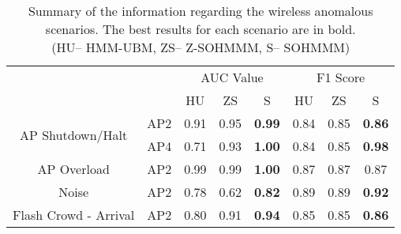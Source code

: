 \begin{table*}[h]
\centering
\caption{Summary of the information regarding the wireless anomalous scenarios. The best results for each scenario are in bold. \\(HU-- HMM-UBM, ZS-- Z-SOHMMM, S-- SOHMMM)}
\label{tbl:sohmmm_results}
\small
\begin{tabular}{cc|ccc|ccc|}
	\cline{3-8}
	& &\multicolumn{3}{c|}{AUC Value} & \multicolumn{3}{c|}{F1 Score} \\ 
	\cline{3-8}
	& & HU & ZS & S & HU & ZS & S \\
		
	\hline
		
	\multicolumn{1}{|c|}{\multirow{2}{*}{AP Shutdown/Halt}} &
	\multicolumn{1}{c|}{AP2} & 0.91 & 0.95 & \textbf{0.99} & 0.84 & 0.85 & \textbf{0.86} \\ \cline{2-8}
	\multicolumn{1}{|c|}{}                        &
	\multicolumn{1}{c|}{AP4} & 0.71 & 0.93 & \textbf{1.00} & 0.84 & 0.85 & \textbf{0.98} \\ \cline{2-8}
	\hline
		
	\multicolumn{1}{|c|}{\multirow{2}{*}{AP Overload}} &
	\multicolumn{1}{c|}{\multirow{2}{*}{AP2}} & 
	\multirow{2}{*}{0.99} & \multirow{2}{*}{0.99} & \multirow{2}{*}{\textbf{1.00}} & \multirow{2}{*}{0.87} & \multirow{2}{*}{0.87} & \multirow{2}{*}{0.87}\\
	\multicolumn{1}{|c|}{}                        & 
	\multicolumn{1}{c|}{} & & & & & & \\ \cline{3-8}
	\hline
		
	\multicolumn{1}{|c|}{\multirow{2}{*}{Noise}} &
	\multicolumn{1}{c|}{\multirow{2}{*}{AP2}} & 
	\multirow{2}{*}{0.78} & \multirow{2}{*}{0.62} & \multirow{2}{*}{\textbf{0.82}} & \multirow{2}{*}{0.89} & \multirow{2}{*}{0.89} & \multirow{2}{*}{\textbf{0.92}}\\
	\multicolumn{1}{|c|}{}                        &
	\multicolumn{1}{c|}{} & & & & & & \\ \cline{3-8}
	\hline
		
	\multicolumn{1}{|c|}{\multirow{2}{*}{Flash Crowd - Arrival}} &
	\multicolumn{1}{c|}{\multirow{2}{*}{AP2}} & 
	\multirow{2}{*}{0.80} & \multirow{2}{*}{0.91} & \multirow{2}{*}{\textbf{0.94}} & \multirow{2}{*}{0.85} & \multirow{2}{*}{0.85} & \multirow{2}{*}{\textbf{0.86}}\\
	\multicolumn{1}{|c|}{}                        &
	\multicolumn{1}{c|}{} & & & & & & \\ \cline{3-8}
	\hline
		

\end{tabular}
\end{table*}
